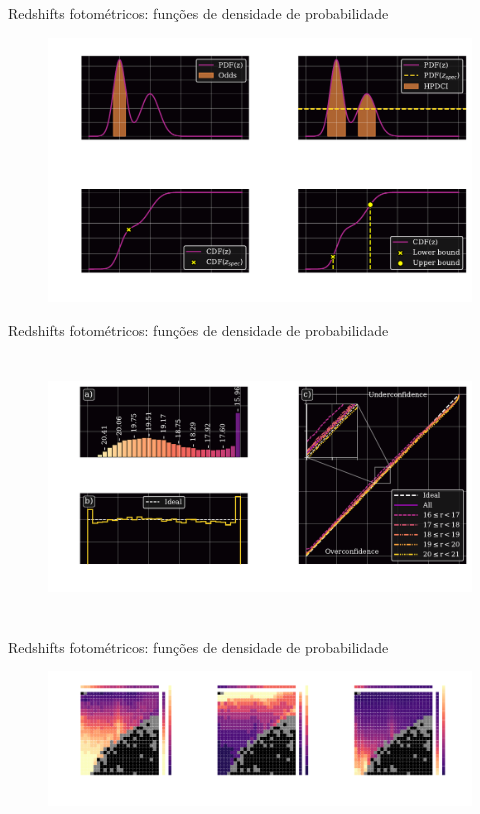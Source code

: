 \begin{frame}[c]{Redshifts fotométricos: funções de densidade de probabilidade}
    \begin{figure}
        \centering
        \includegraphics[height=7cm]{script/images/results_pdf_metrics_illust_2.pdf}
    \end{figure}
\end{frame}


\begin{frame}[c]{Redshifts fotométricos: funções de densidade de probabilidade}
    \begin{figure}
        \centering
        \includegraphics[height=7cm]{script/images/result_pdf_summary.pdf}
    \end{figure}
\end{frame}

\begin{frame}[c]{Redshifts fotométricos: funções de densidade de probabilidade}
    \begin{figure}
        \centering
        \includegraphics[width=\linewidth]{script/images/results_pdf_metrics_2d.pdf}
    \end{figure}
\end{frame}

